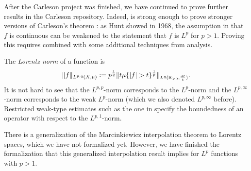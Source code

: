 \documentclass[12pt]{amsart}
\theoremstyle{definition}
\theoremstyle{plain}
\begin{document}
After the Carleson project was finished,
we have continued to prove further results in the Carleson repository.
Indeed,  is strong enough to prove stronger versions of Carleson's theorem :
as Hunt \cite{MR238019} showed in 1968,
the assumption in  that $f$ is continuous
can be weakened to the statement that $f$ is $L^p$ for $p>1$.
Proving this requires  combined with some additional techniques from analysis.

The \emph{Lorentz norm} of a function is
$$\|f\|_{L^{p,q}(X,\mu)}\vcentcolon=
p^{\frac1q}\|t\mu\{|f| > t\}^{\frac1p}\|_{L^q(\mathbb{R}_{>0},\frac{dt}{t})}.$$
It is not hard to see that the $L^{p,p}$-norm corresponds to the $L^p$-norm
and the $L^{p,\infty}$-norm corresponds to the weak $L^p$-norm
(which we also denoted $L^{p,\infty}$ before).
Restricted weak-type estimates such as the one in 
specify the boundedness of an operator with respect to the $L^{p,1}$-norm.

There is a generalization of the Marcinkiewicz interpolation theorem to Lorentz spaces,
which we have not formalized yet.
However, we have finished the formalization that this generalized interpolation result
implies  for $L^p$ functions with $p>1$.

%
%
\printbibliography
\end{document}
